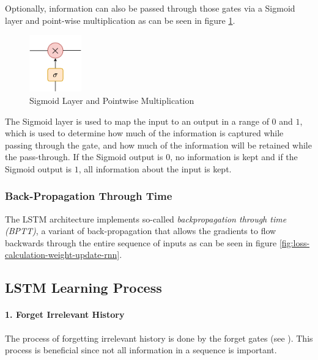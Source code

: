                Optionally, information can also be passed through those gates via a Sigmoid layer and point-wise multiplication as can be seen in figure \ref{fig:sigmoid-layer-and-pointwise-multiplication}.
                \begin{figure}[h!]
                    \centering
                    \includegraphics[width=0.2\textwidth]{figures/sigmoid_layer.drawio.png}
                    \caption{Sigmoid Layer and Pointwise Multiplication}
                    \label{fig:sigmoid-layer-and-pointwise-multiplication}
                \end{figure}
                The Sigmoid layer is used to map the input to an output in a range of $0$ and $1$, which is used to determine how much of the information is captured while passing through the gate, and how much of the information will be retained while the pass-through.
                If the Sigmoid output is $0$, no information is kept and if the Sigmoid output is $1$, all information about the input is kept.

            \subsubsection{Back-Propagation Through Time}
            \label{sec:back-propagation-through-time}

                The LSTM architecture implements so-called \emph{backpropagation through time (BPTT)}, a variant of back-propagation that allows the gradients to flow backwards through the entire sequence of inputs as can be seen in figure \ref{fig:loss-calculation-weight-update-rnn}.

            
    \subsection{LSTM Learning Process} %

        \paragraph{1. Forget Irrelevant History}

            The process of forgetting irrelevant history is done by the forget gates (see ).
            This process is beneficial since not all information in a sequence is important. 

